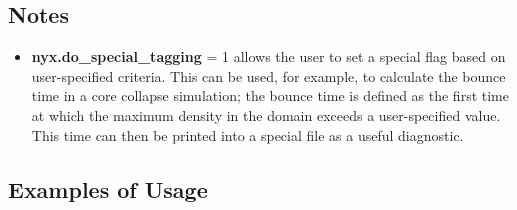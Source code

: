 \subsection{Notes}

\begin{itemize}

\item {\bf nyx.do\_special\_tagging} = 1 allows the user to set a special flag based on
user-specified criteria.  This can be used, for example, to calculate the bounce time in a 
core collapse simulation; the bounce time is defined as the first time at which the maximum
density in the domain exceeds a user-specified value.   This time can then be printed into
a special file as a useful diagnostic.

\end{itemize}

\subsection{Examples of Usage}

